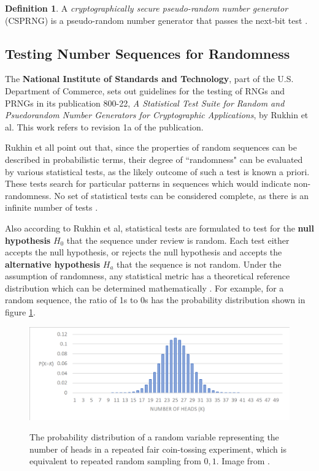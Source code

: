 \documentclass[12pt, titlepage]{report}
\theoremstyle{definition}
\newtheorem{definition}{Definition}
\begin{document}
\begin{definition}
A \textit{cryptographically secure pseudo-random number generator} (CSPRNG) is a pseudo-random number generator that passes the next-bit test \cite[p. 171]{menezes1996handbook}.
\end{definition}





\subsection{Testing Number Sequences for Randomness}\label{subsection:testing_prngs}

The \textbf{National Institute of Standards and Technology}, part of the U.S. Department of Commerce, sets out guidelines for the testing of RNGs and PRNGs in its publication 800-22, \textit{A Statistical Test Suite for Random and Psuedorandom Number Generators for Cryptographic Applications}, by Rukhin et al. This work refers to revision 1a of the publication.

Rukhin et all point out that, since the properties of random sequences can be described in probabilistic terms, their degree of ``randomness" can be evaluated by various statistical tests, as the likely outcome of such a test is known a priori. These tests search for particular patterns in sequences which would indicate non-randomness. No set of statistical tests can be considered complete, as there is an infinite number of tests \cite[p. 1-2]{rukhin2001statistical}.

Also according to Rukhin et al, statistical tests are formulated to test for the \textbf{null hypothesis} $H_0$ that the sequence under review is random. Each test either accepts the null hypothesis, or rejects the null hypothesis and accepts the \textbf{alternative hypothesis} $H_a$ that the sequence is not random. Under the assumption of randomness, any statistical metric has a theoretical reference distribution which can be determined mathematically \cite[p. 1.3]{rukhin2001statistical}. For example, for a random sequence, the ratio of 1s to 0s has the probability distribution shown in figure \ref{figure:distribution}.

\begin{figure}
\centering
\includegraphics[width=1\textwidth]{img/distribution.png}\\
\caption{The probability distribution of a random variable representing the number of heads in a repeated fair coin-tossing experiment, which is equivalent to repeated random sampling from ${0, 1}$. Image from \cite{terr2009math}.}
\label{figure:distribution}
\end{figure}
	
\end{document}
